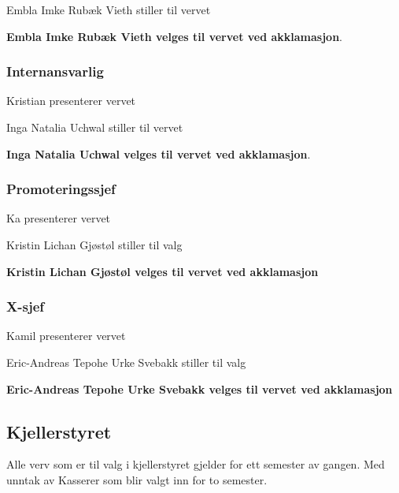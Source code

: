 \documentclass[10pt,norsk,a4paper,usenames,dvipsnames]{article}
\begin{document}
\begin{multicols}{2}
        Embla Imke Rubæk Vieth stiller til vervet

        \textbf{Embla Imke Rubæk Vieth velges til vervet ved akklamasjon}. 



        \subsubsection{Internansvarlig}

        Kristian presenterer vervet

        Inga Natalia Uchwal stiller til vervet
        
        \textbf{Inga Natalia Uchwal velges til vervet ved akklamasjon}. 


        \subsubsection{Promoteringssjef}

        Ka presenterer vervet

        Kristin Lichan Gjøstøl stiller til valg

        \textbf{Kristin Lichan Gjøstøl velges til vervet ved akklamasjon}
        

        
        \subsubsection{X-sjef}

        Kamil presenterer vervet

        Eric-Andreas Tepohe Urke Svebakk stiller til valg

        \textbf{Eric-Andreas Tepohe Urke Svebakk velges til vervet ved akklamasjon}
        
        
    \subsection{Kjellerstyret} %
        Alle verv som er til valg i kjellerstyret gjelder for ett semester av gangen. Med unntak av Kasserer som blir valgt inn for to semester.


\end{multicols}
\end{document}
